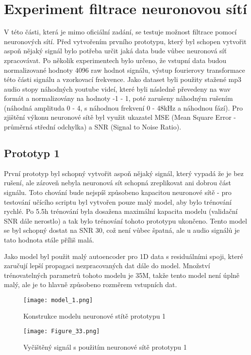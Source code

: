 \section{Experiment filtrace neuronovou sítí}

V této části, která je mimo oficiální zadání, se testuje možnost filtrace pomocí neuronových sítí.
Před vytvořením prvního prototypu, který byl schopen vytvořit aspoň nějaký signál bylo potřeba určit jaká data bude vůbec neuronová síť zpracovávat.
Po několik experimentech bylo určeno, že vstupní data budou normalizované hodnoty 4096 raw hodnot signálu, výstup fourierovy transformace této části signálu a vzorkovací frekvence.
Jako dataset byli použity stažené mp3 audio stopy náhodných youtube videí, které byli následně převedeny na wav formát a normalizovány na hodnoty -1 - 1, poté zarušeny náhodným rušením (náhodná amplituda 0 - 4, s náhodnou frekvení 0 - 48kHz a náhodnou fází).
Pro zjištění výkonu neuronové sítě byl využit ukazatel MSE (Mean Square Error - průměrná střední odchylka) a SNR (Signal to Noise Ratio).

\subsection{Prototyp 1}

První prototyp byl schopný vytvořit aspoň nějaký signál, který vypadá že je bez rušení, ale zároveň nebyla neuronová sít schopná zreplikovat ani dobrou část signálu.
Toto chování bude nejspíš způsobeno kapacitou neuronové sítě - pro testování učícího scriptu byl vytvořen pouze malý model, aby bylo trénování rychlé.
Po 5.5h trénování byla dosažena maximální kapacita modelu (validační SNR dále nerostlo) a tak bylo trénování tohoto prototypu ukončeno.
Tento model se byl schopný dostat na SNR 30, což není vůbec špatná, ale u audio signálů je tato hodnota stále příliš malá.

Jako model byl použit malý autoencoder pro 1D data s residuálními spoji, které zaručují lepší propagaci nezpracovaných dat dále do model.
Množství trénovatelných parametrů tohoto modelu je 35M, takže tento model není úplně malý, ale je to hlavně způsobeno rozměrem vstupních dat.

\begin{figure}[H] 
	\centering
	\texttt{[image: model\_1.png]}
	\caption{Konstrukce modelu neuronové stítě prototypu 1}
\end{figure}

\begin{landscape}
\begin{figure}[H] 
	\centering
	\texttt{[image: Figure\_33.png]}
	\caption{Vyčištěný signál s použitím neuronové sítě prototypu 1}
\end{figure}
\end{landscape}